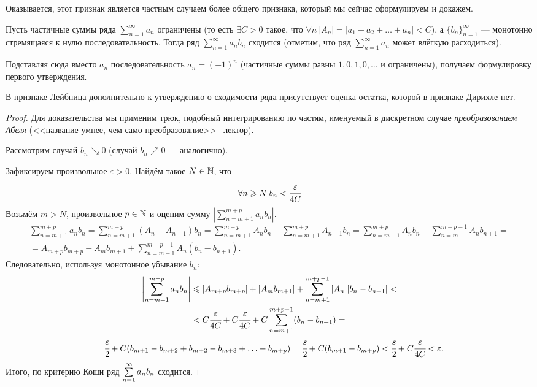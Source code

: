 Оказывается, этот признак является частным случаем более общего признака, который мы сейчас сформулируем и докажем.
\begin{Test}
	Пусть частичные суммы ряда $\sum\limits_{n=1}^{\infty}a_n$ ограничены (то есть $\exists C>0$ такое, что $\forall n\ |A_n| = |a_1 + a_2 + \ldots + a_n| < C$), а $\{b_n\}_{n=1}^{\infty}$ --- монотонно стремящаяся к нулю  последовательность. Тогда ряд $\sum\limits_{n=1}^{\infty}a_nb_n$ сходится (отметим, что ряд $\sum\limits_{n=1}^{\infty}a_n$ может влёгкую расходиться). 
\end{Test}
Подставляя сюда вместо $a_n$ последовательность $a_n = (-1)^n$ (частичные суммы равны $1, 0, 1, 0, \ldots$ и ограничены), получаем формулировку первого утверждения.
\begin{Comment}
	В признаке Лейбница дополнительно к утверждению о сходимости ряда присутствует оценка остатка, которой в признаке Дирихле нет.
\end{Comment}
\begin{proof}
	Для доказательства мы применим трюк, подобный интегрированию по частям, именуемый в дискретном случае \textit{преобразованием Абеля} (<<название умнее, чем само преобразование>> \textcopyright\ лектор).
	
	Рассмотрим случай $b_n \searrow 0$ (случай $b_n \nearrow 0$ --- аналогично).
	
	Зафиксируем произвольное $\varepsilon>0$. Найдём такое $N \in \mathbb{N}$, что 
	$$
		\forall n\geqslant N\; b_n < \cfrac{\varepsilon}{4C}
	$$
	Возьмём $m>N$, произвольное $p\in \mathbb{N}$ и оценим сумму $\left|\sum\limits_{n=m + 1}^{m+p}a_n b_n\right|$.
	\begin{gather*}
		\sum\limits_{n=m+1}^{m+p} a_n b_n = \sum\limits_{n=m+1}^{m+p}\left(A_n - A_{n-1}\right)b_n = \sum\limits_{n=m+1}^{m+p} A_nb_n - \sum\limits_{n=m+1}^{m+p} A_{n-1} b_n = \sum\limits_{n=m+1}^{m+p}A_nb_n - \sum\limits_{n=m}^{m+p - 1}A_nb_{n+1} = \\
		= A_{m+p} b_{m+p} - A_mb_{m+1} + \sum\limits_{n=m+1}^{m+p - 1}A_n\left(b_n-b_{n+1}\right).
	\end{gather*}
	Следовательно, используя монотонное убывание $b_n$:
	\begin{gather*}
		\left|\sum\limits_{n=m+1}^{m+p} a_n b_n\right| \leqslant |A_{m+p}b_{m+p}| + |A_mb_{m+1}| + 		\sum\limits_{n=m+1}^{m+p-1} |A_n||b_n - b_{n+1}| <\\ < C\cfrac{\varepsilon}{4C} + C \cfrac{\varepsilon}{4C} + C 	\sum\limits_{n=m+1}^{m+p-1}( b_n - b_{n+1}) =\\= \cfrac{\varepsilon}{2} + C(b_{m+1} -b_{m+2} + b_{m + 2} - b_{m+3} + \ldots -b_{m+p}) = \cfrac{\varepsilon}{2} + C(b_{m+1} - b_{m+p}) < \cfrac{\varepsilon}{2} + C\cfrac{\varepsilon}{4C} < \varepsilon.
	\end{gather*}
	Итого, по критерию Коши ряд $\sum\limits_{n=1}^{\infty}a_nb_n$ сходится.
\end{proof}
